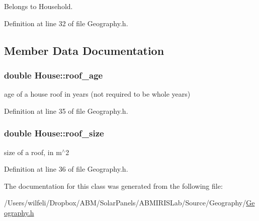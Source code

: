 Belongs to Household. 

Definition at line 32 of file Geography.\+h.



\subsection{Member Data Documentation}
\hypertarget{class_house_a30c17e1166d2dcb0514d6fc25f7c9e9d}{}
\subsubsection[{roof\+\_\+age}]{\setlength{\rightskip}{0pt plus 5cm}double House\+::roof\+\_\+age}\label{class_house_a30c17e1166d2dcb0514d6fc25f7c9e9d}
age of a house roof in years (not required to be whole years) 

Definition at line 35 of file Geography.\+h.

\hypertarget{class_house_a8b9b7814c17814f6df74c5bfb13d5b74}{}
\subsubsection[{roof\+\_\+size}]{\setlength{\rightskip}{0pt plus 5cm}double House\+::roof\+\_\+size}\label{class_house_a8b9b7814c17814f6df74c5bfb13d5b74}
size of a roof, in m$^\wedge$2 

Definition at line 36 of file Geography.\+h.



The documentation for this class was generated from the following file\+:\begin{DoxyCompactItemize}
\item 
/\+Users/wilfeli/\+Dropbox/\+A\+B\+M/\+Solar\+Panels/\+A\+B\+M\+I\+R\+I\+S\+Lab/\+Source/\+Geography/\hyperlink{_geography_8h}{Geography.\+h}\end{DoxyCompactItemize}
